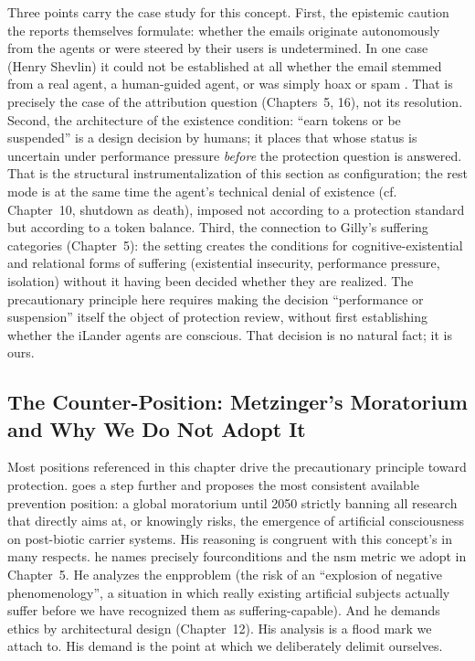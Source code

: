 \documentclass[acmlarge, nonacm]{acmart}
\begin{document}
Three points carry the case study for this concept. First, the epistemic caution the reports themselves formulate: whether the emails originate autonomously from the agents or were steered by their users is undetermined. In one case (Henry Shevlin) it could not be established at all whether the email stemmed from a real agent, a human-guided agent, or was simply hoax or spam \cite{heiseIl}. That is precisely the case of the attribution question (Chapters~5, 16), not its resolution. Second, the architecture of the existence condition: ``earn tokens or be suspended'' is a design decision by humans; it places that whose status is uncertain under performance pressure \textit{before} the protection question is answered. That is the structural instrumentalization of this section as configuration; the rest mode is at the same time the agent's technical denial of existence (cf. Chapter~10, shutdown as death), imposed not according to a protection standard but according to a token balance. Third, the connection to Gilly's suffering categories (Chapter~5): the setting creates the conditions for cognitive-existential and relational forms of suffering (existential insecurity, performance pressure, isolation) without it having been decided whether they are realized. The precautionary principle here requires making the decision ``performance or suspension'' itself the object of protection review, without first establishing whether the iLander agents are conscious. That decision is no natural fact; it is ours.

\subsection{The Counter-Position: Metzinger's Moratorium and Why We Do Not Adopt It}

Most positions referenced in this chapter drive the precautionary principle toward protection. \citet{metzinger2021} goes a step further and proposes the most consistent available prevention position: a global moratorium until 2050 strictly banning all research that directly aims at, or knowingly risks, the emergence of artificial consciousness on post-biotic carrier systems. His reasoning is congruent with this concept's in many respects. he names precisely \gls{fourconditions} and the \gls{nsm} metric we adopt in Chapter~5. He analyzes the \gls{enpproblem} (the risk of an ``explosion of negative phenomenology'', a situation in which really existing artificial subjects actually suffer before we have recognized them as suffering-capable). And he demands ethics by architectural design (Chapter~12). His analysis is a flood mark we attach to. His demand is the point at which we deliberately delimit ourselves.
\end{document}
